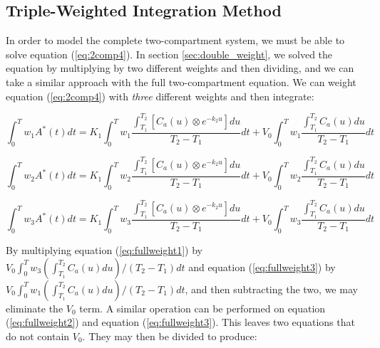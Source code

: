 \subsection{Triple-Weighted Integration Method}

In order to model the complete two-compartment system, we must be able
to solve equation (\ref{eq:2comp4}).  In section
\ref{sec:double_weight},
we solved the equation by multiplying by two different weights and
then dividing, and we can take a similar approach with the full
two-compartment equation.  We can weight equation (\ref{eq:2comp4})
with {\em three} different weights and then integrate:

\begin{equation}
\int_{0}^{T} w_{1}A^{*}(t)dt = K_{1} \int_{0}^{T} w_{1}
\frac{\int_{T_1}^{T_2} \left[ C_{a}(u) \otimes e^{-k_{2}u} \right]
du}{T_2 - T_1} dt + V_{0} \int_{0}^{T}w_{1} \frac{\int_{T_1}^{T_2}
C_{a}(u) du}{T_2 - T_1} dt \label{eq:fullweight1}
\end{equation}

\begin{equation}
\int_{0}^{T} w_{2}A^{*}(t)dt = K_{1} \int_{0}^{T} w_{2}
\frac{\int_{T_1}^{T_2} \left[ C_{a}(u) \otimes e^{-k_{2}u} \right]
du}{T_2 - T_1} dt + V_{0} \int_{0}^{T}w_{2} \frac{\int_{T_1}^{T_2}
C_{a}(u) du}{T_2 - T_1} dt \label{eq:fullweight2}
\end{equation}

\begin{equation}
\int_{0}^{T} w_{3}A^{*}(t)dt = K_{1} \int_{0}^{T} w_{3}
\frac{\int_{T_1}^{T_2} \left[ C_{a}(u) \otimes e^{-k_{2}u} \right]
du}{T_2 - T_1} dt + V_{0} \int_{0}^{T}w_{3} \frac{\int_{T_1}^{T_2}
C_{a}(u) du}{T_2 - T_1} dt \label{eq:fullweight3}
\end{equation}

By multiplying equation (\ref{eq:fullweight1}) by $V_{0}
\int_{0}^{T} w_{3} {(\int_{T_1}^{T_2}C_{a}(u)du)}/{(T_2 - T_1)} dt$
and equation (\ref{eq:fullweight3}) by $V_{0} \int_{0}^{T} w_{1}
{(\int_{T_1}^{T_2}C_{a}(u)du)}/{(T_2 - T_1)} dt$, and then
subtracting the two, we may eliminate the $V_{0}$ term.  A similar
operation can be performed on equation (\ref{eq:fullweight2}) and
equation (\ref{eq:fullweight3}).  This leaves two equations that do
not contain $V_{0}$.  They may then be divided to produce:

